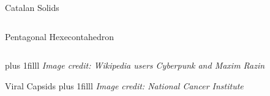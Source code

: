 \documentclass{beamer}
\newcommand{\btVFill}{\vskip0pt plus 1filll}
\begin{document}
\begin{frame}{Catalan Solids}
\begin{columns}
\begin{column}{0.32\textwidth}
      Pentagonal Hexecontahedron
     \end{column}
\end{columns}
\btVFill
\textit{\scriptsize Image credit: Wikipedia users Cyberpunk and Maxim Razin}
\end{frame}
\begin{frame}{Viral Capsids}
%
  \centering
\btVFill
\textit{\scriptsize Image credit: National Cancer Institute} 
\end{frame}
\end{document}
